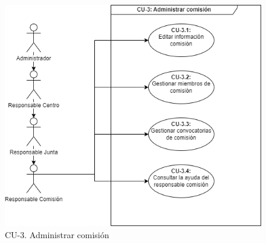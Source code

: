 \begin{figure}[H]
        \centering
        \includegraphics[scale=0.75]{img/diagramas/Funcional/CU-3.png}
        \caption{CU-3. Administrar comisión}
        \label{fig:Diagrama-Caso de uso 3. Administrar comisión}
    \end{figure}
    
